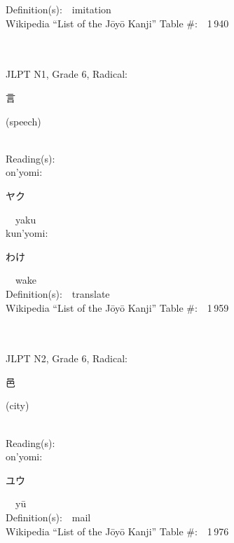 \begin{multicols}{2}
Definition(s):\ \ imitation \\
Wikipedia ``List of the J\=oy\=o Kanji'' Table \#:\ \ 1\,940 \\
\ \ \\
{\fontsize{34pt}{40pt}  }\ \ \\  %
{JLPT N1, Grade 6, Radical:\ \ {\begin{CJK}{UTF8}{min} 言 \end{CJK}} (speech) } \\
Reading(s):\ \ \\
{\hspace*{1em}}on'yomi:\ \ \\
{\hspace*{2em}}{\begin{CJK}{UTF8}{min} ヤク \end{CJK}}\ \ yaku\ \ \\
{\hspace*{1em}}kun'yomi:\ \ \\
{\hspace*{2em}}{\begin{CJK}{UTF8}{min} わけ \end{CJK}}\ \ wake\ \ \\
Definition(s):\ \ translate \\
Wikipedia ``List of the J\=oy\=o Kanji'' Table \#:\ \ 1\,959 \\
\ \ \\
{\fontsize{34pt}{40pt}  }\ \ \\  %
{JLPT N2, Grade 6, Radical:\ \ {\begin{CJK}{UTF8}{min} 邑 \end{CJK}} (city) } \\
Reading(s):\ \ \\
{\hspace*{1em}}on'yomi:\ \ \\
{\hspace*{2em}}{\begin{CJK}{UTF8}{min} ユウ \end{CJK}}\ \ y\=u\ \ \\
Definition(s):\ \ mail \\
Wikipedia ``List of the J\=oy\=o Kanji'' Table \#:\ \ 1\,976 \\

\end{multicols}

